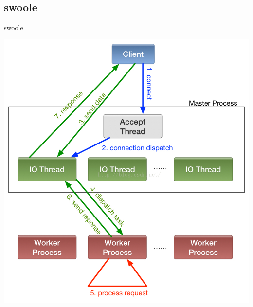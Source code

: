 \documentclass[UTF8]{beamer}
\begin{document}
\subsection{swoole}
\begin{frame}[fragile]{swoole}
  \centerline{\includegraphics[height=\textheight]{img/swoole-model.jpeg}}
\end{frame}
\end{document}
